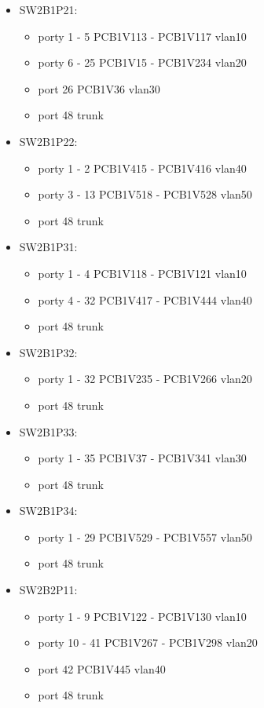 \documentclass[a4paper, 12pt]{article}
\begin{document}
\begin{itemize}
\item SW2B1P21:
	\begin{itemize}
	\item porty 1 - 5 PCB1V113 - PCB1V117 vlan10
	\item porty 6 - 25 PCB1V15 - PCB1V234 vlan20
	\item port 26 PCB1V36 vlan30
	\item port 48 trunk
	\end{itemize}
\item SW2B1P22:
	\begin{itemize}
	\item porty 1 - 2 PCB1V415 - PCB1V416 vlan40
	\item porty 3 - 13 PCB1V518 - PCB1V528 vlan50
	\item port 48 trunk
	\end{itemize}
\item SW2B1P31:
	\begin{itemize}
	\item porty 1 - 4 PCB1V118 - PCB1V121 vlan10
	\item porty 4 - 32 PCB1V417 - PCB1V444 vlan40
	\item port 48 trunk
	\end{itemize}
\item SW2B1P32:
	\begin{itemize}
	\item porty 1 - 32 PCB1V235 - PCB1V266 vlan20
	\item port 48 trunk
	\end{itemize}
\item SW2B1P33:
	\begin{itemize}
	\item porty 1 - 35 PCB1V37 - PCB1V341 vlan30
	\item port 48 trunk
	\end{itemize}
\item SW2B1P34:
	\begin{itemize}
	\item porty 1 - 29 PCB1V529 - PCB1V557 vlan50
	\item port 48 trunk
	\end{itemize}
	
\item SW2B2P11:
	\begin{itemize}
	\item porty 1 - 9 PCB1V122 - PCB1V130 vlan10
	\item porty 10 - 41 PCB1V267 - PCB1V298 vlan20
	\item port 42 PCB1V445 vlan40
	\item port 48 trunk
	\end{itemize}
	

\end{itemize}
\end{document}
